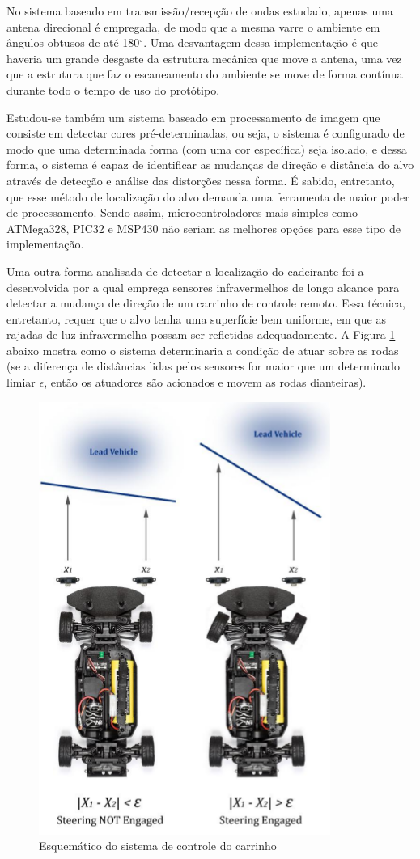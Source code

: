 
\par No sistema baseado em transmissão/recepção de ondas estudado, apenas uma antena direcional é empregada, de modo que a mesma varre o ambiente em ângulos obtusos de até 180$^{\circ}$. Uma desvantagem dessa implementação é que haveria um grande desgaste da estrutura mecânica que move a antena, uma vez que a estrutura que faz o escaneamento do ambiente se move de forma contínua durante todo o tempo de uso do protótipo. 

\par Estudou-se também um sistema baseado em processamento de imagem  \cite{isobe2014human} que consiste em detectar cores pré-determinadas, ou seja, o sistema é configurado de modo que uma determinada forma (com uma cor específica) seja isolado, e dessa forma, o sistema é capaz de identificar as mudanças de direção e distância do alvo através de detecção e análise das distorções nessa forma. É sabido, entretanto, que esse método de localização do alvo demanda uma ferramenta de maior poder de processamento. Sendo assim, microcontroladores mais simples como ATMega328, PIC32 e MSP430 não seriam as melhores opções para esse tipo de implementação.

\par Uma outra forma analisada de detectar a localização do cadeirante foi a desenvolvida por \cite{calcar} a qual emprega sensores infravermelhos de longo alcance para detectar a mudança de direção de um carrinho de controle remoto. Essa técnica, entretanto, requer que o alvo tenha uma superfície bem uniforme, em que as rajadas de luz infravermelha possam ser refletidas adequadamente. A Figura \ref{fig:IRbot} abaixo mostra como o sistema determinaria a condição de atuar sobre as rodas (se a diferença de distâncias lidas pelos sensores for maior que um determinado limiar $\epsilon$, então os atuadores são acionados e movem as rodas dianteiras).
\newpage
 
 \begin{figure}[ht]
		\centering
		\includegraphics[width=.3\textwidth]{figuras/IRbot.png}
		\caption{Esquemático do sistema de controle do carrinho}
		\label{fig:IRbot}
	\end{figure} 

